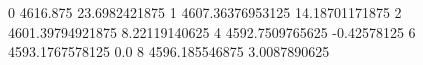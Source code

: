 0 4616.875 23.6982421875
1 4607.36376953125 14.18701171875
2 4601.39794921875 8.22119140625
4 4592.7509765625 -0.42578125
6 4593.1767578125 0.0
8 4596.185546875 3.0087890625
